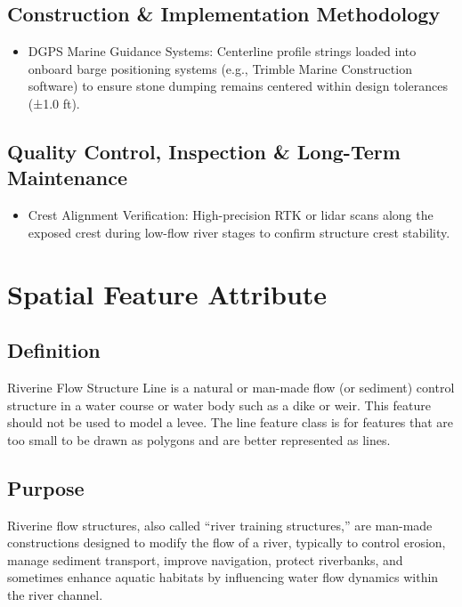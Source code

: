 \documentclass[
  letterpaper,
  DIV=11,
  numbers=noendperiod]{scrreprt}
\providecommand{\tightlist}{%
  \setlength{\itemsep}{0pt}\setlength{\parskip}{0pt}}
\begin{document}
\subsection{Construction \& Implementation
Methodology}\label{construction-implementation-methodology-13}

\begin{itemize}
\tightlist
\item
  DGPS Marine Guidance Systems: Centerline profile strings loaded into
  onboard barge positioning systems (e.g., Trimble Marine Construction
  software) to ensure stone dumping remains centered within design
  tolerances (±1.0 ft).
\end{itemize}

\subsection{Quality Control, Inspection \& Long-Term
Maintenance}\label{quality-control-inspection-long-term-maintenance-13}

\begin{itemize}
\tightlist
\item
  Crest Alignment Verification: High-precision RTK or lidar scans along
  the exposed crest during low-flow river stages to confirm structure
  crest stability.
\end{itemize}

\section{Spatial Feature Attribute}\label{spatial-feature-attribute-9}

\subsection{Definition}\label{definition-12}

Riverine Flow Structure Line is a natural or man-made flow (or sediment)
control structure in a water course or water body such as a dike or
weir. This feature should not be used to model a levee. The line feature
class is for features that are too small to be drawn as polygons and are
better represented as lines.

\subsection{Purpose}\label{purpose-15}

Riverine flow structures, also called ``river training structures,'' are
man-made constructions designed to modify the flow of a river, typically
to control erosion, manage sediment transport, improve navigation,
protect riverbanks, and sometimes enhance aquatic habitats by
influencing water flow dynamics within the river channel.
\end{document}
